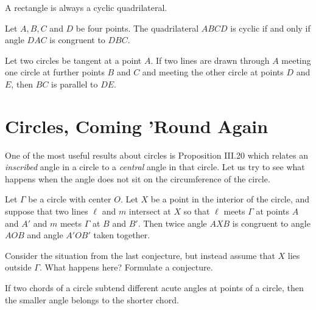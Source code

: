 \begin{conjecture}\label{conj:rect-cyclic}
A rectangle is always a cyclic quadrilateral.
\end{conjecture}

\begin{conjecture}\label{conj:angles-cyclic-quad}
Let $A,B,C$ and $D$ be four points. The quadrilateral $ABCD$ is cyclic if and only if angle $DAC$ is congruent to $DBC$.
\end{conjecture}


\begin{conjecture}\label{conj:tangent-to-two-circles}
Let two circles be tangent at a point $A$. If two lines are drawn through $A$ meeting one circle at further points $B$ and $C$ and meeting the other circle at points $D$ and $E$, then $BC$ is parallel to $DE$.
\end{conjecture}



\chapter{Circles, Coming 'Round Again}
One of the most useful results about circles is Proposition III.20 which relates an \emph{inscribed} angle in a circle to a \emph{central} angle in that circle.
Let us try to see what happens when the angle does not sit on the circumference of the circle.

\begin{conjecture}
Let $\Gamma$ be a circle with center $O$. Let $X$ be a point in the interior of the circle, and suppose that two lines $\ell$ and $m$ intersect at $X$ so that $\ell$ meets $\Gamma$ at points $A$ and $A'$ and $m$ meets $\Gamma$ at $B$ and $B'$.
Then twice angle $AXB$ is congruent to angle $AOB$ and angle $A'OB'$ taken together.
\end{conjecture}

\begin{question}
Consider the situation from the last conjecture, but instead assume that $X$ lies outside $\Gamma$. What happens here? Formulate a conjecture.
\end{question}


\begin{conjecture}
If two chords of a circle subtend different acute angles at points of a circle, then the smaller angle belongs to the shorter chord.
\end{conjecture}

